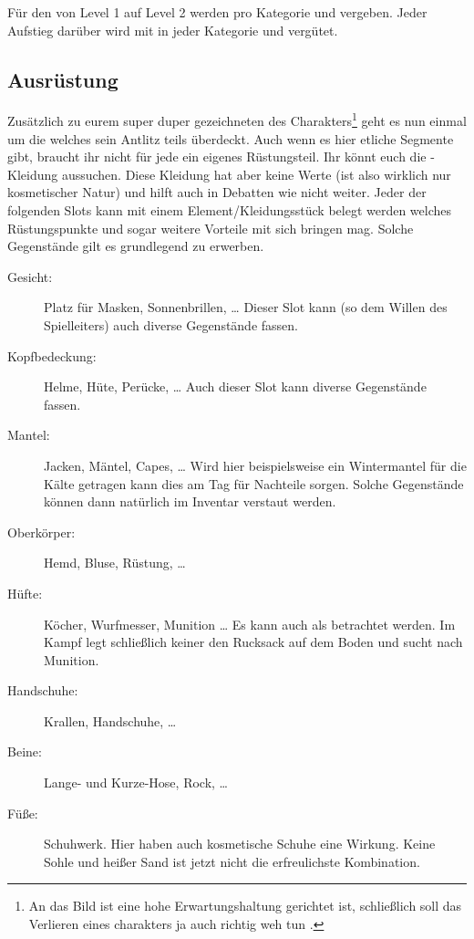 Für den  von Level 1 auf Level 2 werden \SP[6] pro Kategorie und \GP[3] vergeben.
Jeder Aufstieg darüber wird mit \SP[6] in jeder Kategorie und \GP[4] vergütet.

\subsection{Ausrüstung}

Zusätzlich zu eurem super duper gezeichneten  des Charakters\footnote{An das Bild ist eine hohe Erwartungshaltung gerichtet ist, schließlich soll das Verlieren eines charakters ja auch richtig weh tun \Winkey.} geht es nun einmal um die  welches sein Antlitz teils überdeckt.
Auch wenn es hier etliche Segmente gibt, braucht ihr nicht für jede ein eigenes Rüstungsteil. Ihr könnt euch die -Kleidung aussuchen. Diese Kleidung hat aber
keine Werte (ist also wirklich nur kosmetischer Natur) und hilft auch in Debatten wie  nicht weiter.
Jeder der folgenden Slots kann mit einem Element/Kleidungsstück belegt werden welches
Rüstungspunkte und sogar weitere Vorteile mit sich bringen mag. Solche Gegenstände gilt
es grundlegend zu erwerben. %
\begin{description}
    \item[Gesicht:] Platz für Masken, Sonnenbrillen, \ldots{} Dieser Slot kann (so dem Willen des Spielleiters) auch diverse Gegenstände fassen.
    \item[Kopfbedeckung:] Helme, Hüte, Perücke, \ldots{} Auch dieser Slot kann diverse Gegenstände fassen.
    \item[Mantel:] Jacken, Mäntel, Capes, \ldots{} Wird hier beispielsweise ein Wintermantel für die Kälte getragen kann dies am Tag für Nachteile sorgen. Solche Gegenstände können dann natürlich im Inventar verstaut werden.
    \item[Oberkörper:] Hemd, Bluse, Rüstung, \ldots{}
    \item[Hüfte:] Köcher, Wurfmesser, Munition \ldots{} Es kann auch als  betrachtet werden. Im Kampf legt schließlich keiner den Rucksack auf dem Boden und sucht nach Munition.
    \item[Handschuhe:] Krallen, Handschuhe, \ldots{}
    \item[Beine:] Lange- und Kurze-Hose, Rock, \ldots{}
    \item[Füße:] Schuhwerk. Hier haben auch kosmetische Schuhe eine Wirkung. Keine Sohle und heißer Sand ist jetzt nicht die erfreulichste Kombination.
\end{description}

